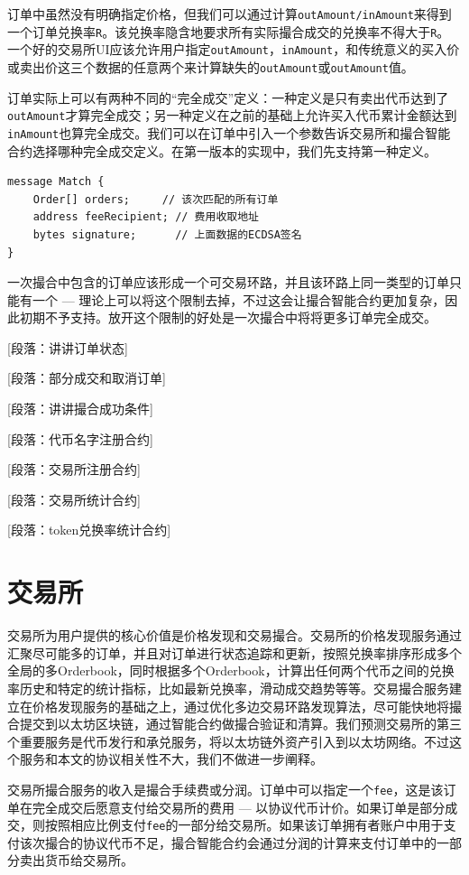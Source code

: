 \documentclass[UTF8,nofonts]{ctexart}
\begin{document}
订单中虽然没有明确指定价格，但我们可以通过计算\verb|outAmount/inAmount|来得到一个订单兑换率\verb|R|。该兑换率隐含地要求所有实际撮合成交的兑换率不得大于\verb|R|。一个好的交易所UI应该允许用户指定\verb|outAmount|，\verb|inAmount|，和传统意义的买入价或卖出价这三个数据的任意两个来计算缺失的\verb|outAmount|或\verb|outAmount|值。

订单实际上可以有两种不同的“完全成交”定义：一种定义是只有卖出代币达到了\verb|outAmount|才算完全成交；另一种定义在之前的基础上允许买入代币累计金额达到\verb|inAmount|也算完全成交。我们可以在订单中引入一个参数告诉交易所和撮合智能合约选择哪种完全成交定义。在第一版本的实现中，我们先支持第一种定义。

\begin{verbatim}
message Match {
    Order[] orders;     // 该次匹配的所有订单
    address feeRecipient; // 费用收取地址
    bytes signature;      // 上面数据的ECDSA签名
}
\end{verbatim}

一次撮合中包含的订单应该形成一个可交易环路，并且该环路上同一类型的订单只能有一个 --- 理论上可以将这个限制去掉，不过这会让撮合智能合约更加复杂，因此初期不予支持。放开这个限制的好处是一次撮合中将将更多订单完全成交。


[段落：讲讲订单状态]

[段落：部分成交和取消订单]

[段落：讲讲撮合成功条件]


[段落：代币名字注册合约]

[段落：交易所注册合约]

[段落：交易所统计合约]

[段落：token兑换率统计合约]


\section{交易所\label{sec:exchange}}

交易所为用户提供的核心价值是价格发现和交易撮合。交易所的价格发现服务通过汇聚尽可能多的订单，并且对订单进行状态追踪和更新，按照兑换率排序形成多个全局的多Orderbook，同时根据多个Orderbook，计算出任何两个代币之间的兑换率历史和特定的统计指标，比如最新兑换率，滑动成交趋势等等。交易撮合服务建立在价格发现服务的基础之上，通过优化多边交易环路发现算法，尽可能快地将撮合提交到以太坊区块链，通过智能合约做撮合验证和清算。我们预测交易所的第三个重要服务是代币发行和承兑服务，将以太坊链外资产引入到以太坊网络。不过这个服务和本文的协议相关性不大，我们不做进一步阐释。

交易所撮合服务的收入是撮合手续费或分润。订单中可以指定一个\verb|fee|，这是该订单在完全成交后愿意支付给交易所的费用 --- 以协议代币计价。如果订单是部分成交，则按照相应比例支付\verb|fee|的一部分给交易所。如果该订单拥有者账户中用于支付该次撮合的协议代币不足，撮合智能合约会通过分润的计算来支付订单中的一部分卖出货币给交易所。
\end{document}
